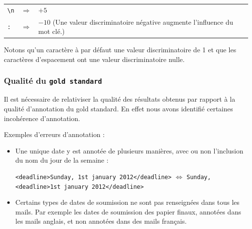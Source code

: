 \documentclass[a4paper,french,10pt]{article}
\begin{document}
\begin{tabular}{l c l}
\verb+\n+ & $\Rightarrow$ & $+5$ \\
\verb+:+ & $\Rightarrow$ & $-10$ (Une valeur discriminatoire négative augmente l'influence du mot clé.)\\
\end{tabular}

Notons qu'un caractère à par défaut une valeur discriminatoire de 1 et que les caractères d'espacement ont une valeur discriminatoire nulle.

\subsubsection{Qualité du \texttt{gold standard}}
Il est nécessaire de relativiser la qualité des résultats obtenus par rapport à la qualité d'annotation du gold standard. En effet nous avons identifié certaines incohérence d'annotation.

Exemples d'erreurs d'annotation :
\begin{itemize}
\item Une unique date y est annotée de plusieurs manières, avec ou non l'inclusion du nom du jour de la semaine :

\texttt{<deadline>Sunday, 1st january 2012</deadline>} $\Leftrightarrow$ \texttt{Sunday, <deadline>1st january 2012</deadline>}

\item Certains types de dates de soumission ne sont pas renseignées dans tous les mails. Par exemple les dates de soumission des papier finaux, annotées dans les mails anglais, et non annotées dans des mails français.
\end{itemize}
\end{document}

